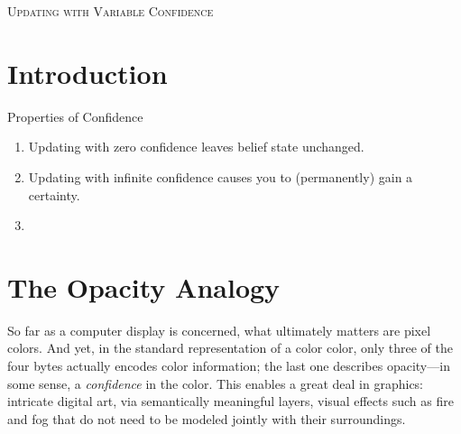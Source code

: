 \documentclass{article}
\begin{document}
\begin{center}
    \Large\scshape
    Updating with Variable Confidence
\end{center}
\bigskip

\tableofcontents


\section{Introduction}

Properties of Confidence
\begin{enumerate}[nosep]
    \item Updating with zero confidence leaves belief state unchanged.
    \item Updating with infinite confidence causes you to (permanently) gain a certainty.
    \item 
\end{enumerate}


\section{The Opacity Analogy}


    So far as a computer display is concerned, what ultimately matters are pixel colors.
    And yet, in the standard representation of a color color, only three of the four bytes actually encodes color information; the last one describes opacity---in some sense, a \emph{confidence} in the color.
    This enables a great deal in graphics: intricate digital art, via semantically meaningful layers,
        visual effects such as fire and fog that do not need to be modeled jointly with their surroundings.
\end{document}
